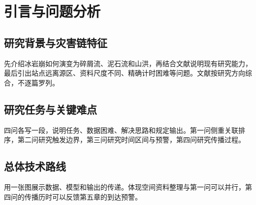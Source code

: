 \section{引言与问题分析}\label{sec:introduction}

\subsection{研究背景与灾害链特征}\label{sec:background}
先介绍冰岩崩如何演变为碎屑流、泥石流和山洪，再结合文献说明现有研究能力，最后引出站点远离源区、资料尺度不同、精确计时困难等问题。文献按研究方向综合，不逐篇罗列。

\subsection{研究任务与关键难点}\label{sec:tasks}
四问各写一段，说明任务、数据困难、解决思路和规定输出。第一问侧重关联排序，第二问研究触发边界，第三问研究时间区间与预警，第四问研究传播过程。

\subsection{总体技术路线}\label{sec:workflow}
用一张图展示数据、模型和输出的传递。体现空间资料整理与第一问可以并行，第四问的传播历时可以反馈第五章的到达预警。
